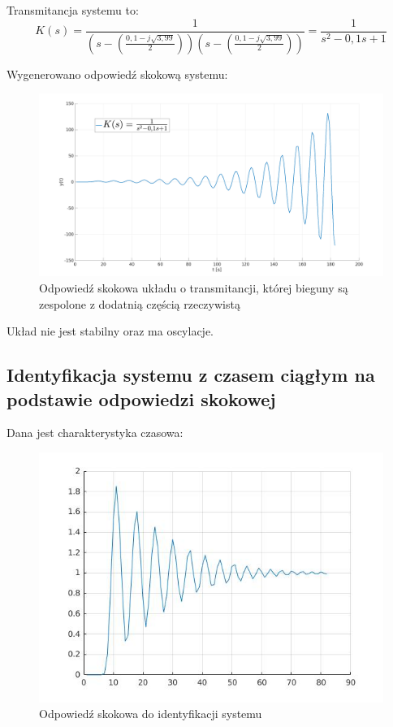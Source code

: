 \documentclass[12pt]{article}
\begin{document}
Transmitancja systemu to:
\begin{equation}
    K(s) = \frac{1}{(s-(\frac{0,1 - j \sqrt{3,99}}{2}))(s-(\frac{0,1 - j \sqrt{3,99}}{2}))} = \frac{1}{s^2-0,1s+1}
\end{equation}

Wygenerowano odpowiedź skokową systemu:

\begin{figure}[H]
    \centering
    \includegraphics[width=18cm]{zespolone_dodatnia.png}
    \caption{Odpowiedź skokowa układu o transmitancji, której bieguny są zespolone z dodatnią częścią rzeczywistą}
\end{figure}

Układ nie jest stabilny oraz ma oscylacje.


\subsection{Identyfikacja systemu z czasem ciągłym na podstawie odpowiedzi skokowej}
Dana jest charakterystyka czasowa:

\begin{figure}[H]
    \centering
    \includegraphics[width=15cm]{obojetnie.jpg}
    \caption{Odpowiedź skokowa do identyfikacji systemu}
\end{figure}
\end{document}
